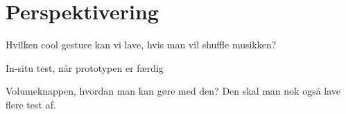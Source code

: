 \chapter{Perspektivering}
\label{Perspektivering}
Hvilken cool gesture kan vi lave, hvis man vil shuffle musikken?

In-situ test, når prototypen er færdig

Volumeknappen, hvordan man kan gøre med den? Den skal man nok også lave flere test af. 